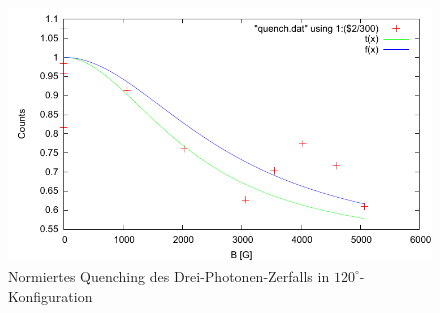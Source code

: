 \begin{figure}
 \includegraphics[width=\textwidth]{Auswertung/quench-normiert.pdf}
 \caption{Normiertes Quenching des Drei-Photonen-Zerfalls in $120^\circ$-Konfiguration}
\end{figure}
